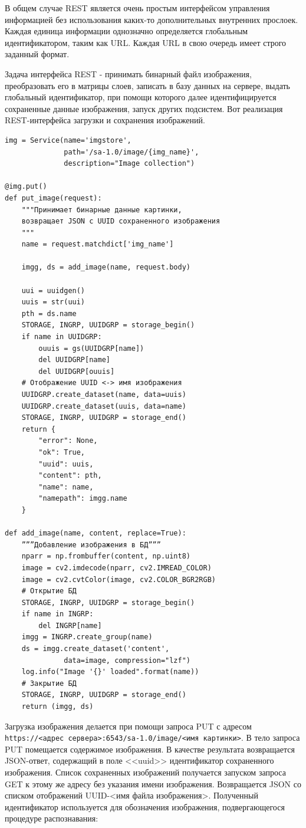 \documentclass[732,14pt,final]{studrep}
\begin{document}
В общем случае REST является очень простым интерфейсом управления информацией без использования каких-то дополнительных внутренних прослоек. Каждая единица информации однозначно определяется глобальным идентификатором, таким как URL. Каждая URL в свою очередь имеет строго заданный формат.

Задача интерфейса REST - принимать бинарный файл изображения, преобразовать его в матрицы слоев, записать в базу данных на сервере, выдать глобальный идентификатор, при помощи которого далее идентифицируется сохраненные данные изображения, запуск других подсистем. Вот реализация REST-интерфейса загрузки и сохранения изображений.
\begin{verbatim}
img = Service(name='imgstore',
              path='/sa-1.0/image/{img_name}',
              description="Image collection")

@img.put()
def put_image(request):
    """Принимает бинарные данные картинки,
    возвращает JSON с UUID сохраненного изображения
    """
    name = request.matchdict['img_name']

    imgg, ds = add_image(name, request.body)

    uui = uuidgen()
    uuis = str(uui)
    pth = ds.name
    STORAGE, INGRP, UUIDGRP = storage_begin()
    if name in UUIDGRP:
        ouuis = gs(UUIDGRP[name])
        del UUIDGRP[name]
        del UUIDGRP[ouuis]
    # Отображение UUID <-> имя изображения
    UUIDGRP.create_dataset(name, data=uuis)
    UUIDGRP.create_dataset(uuis, data=name)
    STORAGE, INGRP, UUIDGRP = storage_end()
    return {
        "error": None,
        "ok": True,
        "uuid": uuis,
        "content": pth,
        "name": name,
        "namepath": imgg.name
    }

def add_image(name, content, replace=True):
    ”””Добавление изображения в БД”””
    nparr = np.frombuffer(content, np.uint8)
    image = cv2.imdecode(nparr, cv2.IMREAD_COLOR)
    image = cv2.cvtColor(image, cv2.COLOR_BGR2RGB)
    # Открытие БД
    STORAGE, INGRP, UUIDGRP = storage_begin()
    if name in INGRP:
        del INGRP[name]
    imgg = INGRP.create_group(name)
    ds = imgg.create_dataset('content',
              data=image, compression="lzf")
    log.info("Image '{}' loaded".format(name))
    # Закрытие БД
    STORAGE, INGRP, UUIDGRP = storage_end()
    return (imgg, ds)
\end{verbatim}
Загрузка изображения делается при помощи запроса PUT с адресом \verb|https://<адрес сервера>:6543/sa-1.0/image/<имя картинки>|. В тело запроса PUT помещается содержимое изображения. В качестве результата возвращается JSON-ответ, содержащий в поле <<uuid>> идентификатор сохраненного изображения. Список сохраненных изображений получается запуском запроса GET к этому же адресу без указания имени изображения. Возвращается JSON со списком отображений UUID-<имя файла изображения>. Полученный идентификатор используется для обозначения изображения, подвергающегося процедуре распознавания:
\end{document}
